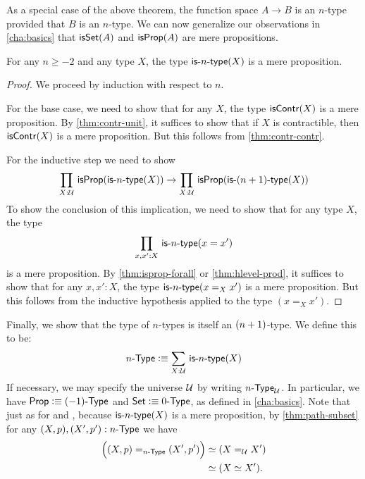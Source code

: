 As a special case of the above theorem, the function space $A \to B$ is an $n$-type provided that $B$ is an $n$-type.
We can now generalize our observations in \autoref{cha:basics} that $\isset(A)$ and $\isprop(A)$ are mere propositions.

\begin{thm}\label{thm:isaprop-isofhlevel}
 For any $n \geq -2$ and any type $X$, the type $\istype{n}(X)$ is a mere proposition.
\end{thm}
\begin{proof}
  We proceed by induction with respect to $n$.

 For the base case, we need to show that for any $X$, the type $\iscontr(X)$ is a mere proposition.
 By \autoref{thm:contr-unit}, it suffices to show that if $X$ is contractible, then $\iscontr(X)$ is a mere proposition.
 But this follows from \autoref{thm:contr-contr}.

For the inductive step we need to show
\[\prd{X : \type} \isprop (\istype{n}(X)) \to \prd{X : \type} \isprop (\istype{\nplusone}(X)) \]
To show the conclusion of this implication, we need to show that for any type $X$, the type
\[\prd{x, x' : X}\istype{n}(x = x')\]
is a mere proposition. By \autoref{thm:isprop-forall} or \autoref{thm:hlevel-prod}, it suffices to show that for any $x, x' : X$, the type $\istype{n}(x =_X x')$ is a mere
proposition.
But this follows from the inductive hypothesis applied to the type $(x =_X x')$.
\end{proof}

Finally, we show that the type of $n$-types is itself an $\nplusone$-type.
We define this to be:
\[\ntype{n} \defeq \sm{X : \type} \istype{n}(X) \]
If necessary, we may specify the universe $\UU$ by writing $\ntypeU{n}$.
In particular, we have $\prop \defeq \ntype{(-1)}$ and $\set \defeq \ntype{0}$, as defined in \autoref{cha:basics}.
Note that just as for \prop and \set, because $\istype{n}(X)$ is a mere proposition, by \autoref{thm:path-subset} for any $(X,p), (X',p'):\ntype{n}$ we have
\begin{align*}
  \Big(\id[\ntype{n}]{(X, p)}{(X', p')}\Big) &\eqvsym (\id[\type] X X')\\
  &\eqvsym (\eqv{X}{X'}).
\end{align*}

